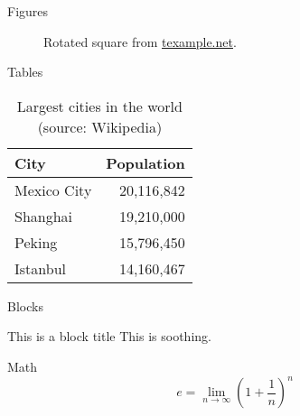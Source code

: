 \documentclass[10pt, compress]{beamer}
\renewcommand{\(}{\begin{columns}}
\renewcommand{\)}{\end{columns}}
\newcommand{\<}[1]{\begin{column}{#1}}
\renewcommand{\>}{\end{column}}
\begin{document}
\begin{frame}{Figures}
  \begin{figure}
    \setcounter{density}{20}
    \caption{Rotated square from
    \href{http://www.texample.net/tikz/examples/rotated-polygons/}{texample.net}.}
  \end{figure}
\end{frame}
\begin{frame}{Tables}
  \begin{table}
    \caption{Largest cities in the world (source: Wikipedia)}
    \begin{tabular}{lr}
      \toprule
      City & Population\\
      \midrule
      Mexico City & 20,116,842\\
      Shanghai & 19,210,000\\
      Peking & 15,796,450\\
      Istanbul & 14,160,467\\
      \bottomrule
    \end{tabular}
  \end{table}
\end{frame}
\begin{frame}{Blocks}

  \begin{block}{This is a block title}
    This is soothing.
  \end{block}

\end{frame}
\begin{frame}{Math}
  \begin{equation*}
    e = \lim_{n\to \infty} \left(1 + \frac{1}{n}\right)^n
  \end{equation*}
\end{frame}
\end{document}
